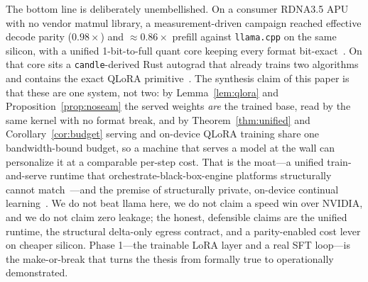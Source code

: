 \documentclass[11pt]{article}
\begin{document}
The bottom line is deliberately unembellished. On a consumer RDNA3.5 APU with no vendor matmul library, a measurement-driven campaign reached effective decode parity ($0.98\times$) and $\approx 0.86\times$ prefill against \texttt{llama.cpp} on the same silicon, with a unified 1-bit-to-full quant core keeping every format bit-exact~\cite{hanzo-rocm}. On that core sits a \texttt{candle}-derived Rust autograd that already trains two algorithms and contains the exact QLoRA primitive~\cite{hanzo-train}. The synthesis claim of this paper is that these are one system, not two: by Lemma~\ref{lem:qlora} and Proposition~\ref{prop:noseam} the served weights \emph{are} the trained base, read by the same kernel with no format break, and by Theorem~\ref{thm:unified} and Corollary~\ref{cor:budget} serving and on-device QLoRA training share one bandwidth-bound budget, so a machine that serves a model at the wall can personalize it at a comparable per-step cost. That is the moat---a unified train-and-serve runtime that orchestrate-black-box-engine platforms structurally cannot match~\cite{kubeflow,kserve,ray}---and the premise of structurally private, on-device continual learning~\cite{hanzo-clp,hanzo-platform}. We do not beat llama here, we do not claim a speed win over NVIDIA, and we do not claim zero leakage; the honest, defensible claims are the unified runtime, the structural delta-only egress contract, and a parity-enabled cost lever on cheaper silicon. Phase 1---the trainable LoRA layer and a real SFT loop---is the make-or-break that turns the thesis from formally true to operationally demonstrated.
\end{document}
